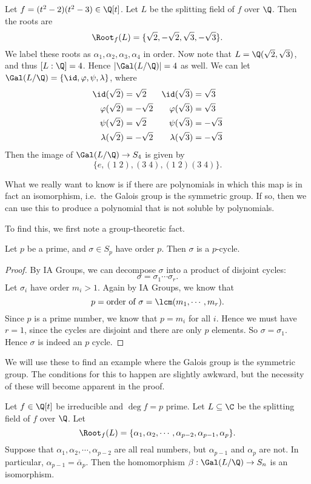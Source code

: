 \documentclass[a4paper]{article}
\begin{document}
\begin{eg}
  Let $f = (t^2 - 2)(t^2 - 3) \in \Q[t]$. Let $L$ be the splitting field of $f$ over $\Q$. Then the roots are
  \[
    \Root_f(L) = \{\sqrt{2}, - \sqrt{2}, \sqrt{3}, -\sqrt{3}\}.
  \]
  We label these roots as $\alpha_1, \alpha_2, \alpha_3, \alpha_4$ in order. Now note that $L = \Q(\sqrt{2}, \sqrt{3})$, and thus $[L:\Q] = 4$. Hence $|\Gal(L/\Q)| = 4$ as well. We can let $\Gal(L/\Q) = \{\id, \varphi, \psi, \lambda\}$, where
  \begin{align*}
    \id(\sqrt{2}) &= \sqrt{2} & \id(\sqrt{3}) &= \sqrt{3}\\
    \varphi(\sqrt{2}) &= -\sqrt{2} & \varphi(\sqrt{3}) &= \sqrt{3}\\
    \psi(\sqrt{2}) &= \sqrt{2} & \psi(\sqrt{3}) &= -\sqrt{3}\\
    \lambda(\sqrt{2}) &= -\sqrt{2} & \lambda(\sqrt{3}) &= -\sqrt{3}
  \end{align*}
  Then the image of $\Gal(L/\Q) \to S_4$ is given by
  \[
    \{e, (1\; 2), (3\; 4), (1\; 2)(3\; 4)\}.
  \]
\end{eg}

What we really want to know is if there are polynomials in which this map is in fact an isomorphism, i.e.\ the Galois group is the symmetric group. If so, then we can use this to produce a polynomial that is not soluble by polynomials.

To find this, we first note a group-theoretic fact.
\begin{lemma}
  Let $p$ be a prime, and $\sigma \in S_p$ have order $p$. Then $\sigma$ is a $p$-cycle.
\end{lemma}

\begin{proof}
  By IA Groups, we can decompose $\sigma$ into a product of disjoint cycles:
  \[
    \sigma = \sigma_1 \cdots \sigma_r.
  \]
  Let $\sigma_i$ have order $m_i > 1$. Again by IA Groups, we know that
  \[
    p = \text{order of }\sigma = \lcm(m_1, \cdots, m_r).
  \]
  Since $p$ is a prime number, we know that $p = m_i$ for all $i$. Hence we must have $r = 1$, since the cycles are disjoint and there are only $p$ elements. So $\sigma = \sigma_1$. Hence $\sigma$ is indeed an $p$ cycle.
\end{proof}

We will use these to find an example where the Galois group is the symmetric group. The conditions for this to happen are slightly awkward, but the necessity of these will become apparent in the proof.
\begin{thm}
  Let $f \in \Q[t]$ be irreducible and $\deg f = p$ prime. Let $L\subseteq \C$ be the splitting field of $f$ over $\Q$. Let
  \[
    \Root_f(L) = \{\alpha_1, \alpha_2, \cdots, \alpha_{p - 2}, \alpha_{p - 1}, \alpha_p\}.
  \]
  Suppose that $\alpha_1, \alpha_2, \cdots, \alpha_{p - 2}$ are all real numbers, but $\alpha_{p - 1}$ and $\alpha_p$ are not. In particular, $\alpha_{p - 1} = \bar{\alpha}_p$. Then the homomorphism $\beta: \Gal(L/\Q) \to S_n$ is an isomorphism.
\end{thm}
\end{document}
